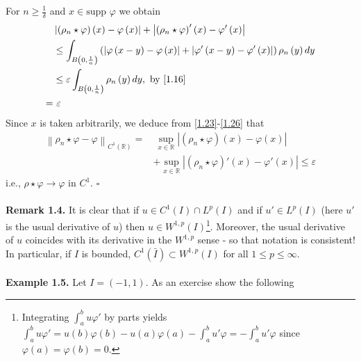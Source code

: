 \documentclass[a4paper,oneside]{book}
\numberwithin{equation}{chapter}
\begin{document}
For $n\ge \frac{1}{\delta}$ and $x\in \mbox{supp }\varphi$ we obtain
\begin{align}
\label{1.23}
&\left| {\left( {{\rho _n}\star \varphi } \right)\left( x \right) - \varphi \left( x \right)} \right| + \left| {\left( {{\rho _n}\star\varphi } \right)'\left( x \right) - \varphi '\left( x \right)} \right|\\
 &\le \int_{B\left( {0,\frac{1}{n}} \right)} {\left( {\left| {\varphi \left( {x - y} \right) - \varphi \left( x \right)} \right| + \left| {\varphi '\left( {x - y} \right) - \varphi '\left( x \right)} \right|} \right){\rho _n}\left( y \right)dy} \\
& \le \varepsilon \int_{B\left( {0,\frac{1}{n}} \right)} {{\rho _n}\left( y \right)dy},\mbox{ by \eqref{1.16}}\\
=&\ \varepsilon  \label{1.26}
\end{align}
Since $x$ is taken arbitrarily, we deduce from \eqref{1.23}-\eqref{1.26} that
\begin{align}
{\left\| {{\rho _n}\star \varphi  - \varphi } \right\|_{{C^1}\left( \mathbb{R} \right)}} =&\ \mathop {\sup }\limits_{x \in \mathbb{R}} \left| {\left( {{\rho _n}\star \varphi } \right)\left( x \right) - \varphi \left( x \right)} \right| \\
&+ \mathop {\sup }\limits_{x \in \mathbb{R}} \left| {\left( {{\rho _n}\star\varphi } \right)'\left( x \right) - \varphi '\left( x \right)} \right| \le \varepsilon 
\end{align}
i.e., $\rho \star \varphi \to \varphi$ in $C^1$. \hfill $\square$\\
\\
\textbf{Remark 1.4.} It is clear that if $u \in {C^1}\left( I \right) \cap {L^p}\left( I \right)$ and if $u' \in {L^p}\left( I \right)$ (here $u'$ is the usual derivative of $u$) then $u\in W^{1,p}\left(I\right)$\footnote{Integrating $\int_a^b {u\varphi '} $ by parts yields $\int_a^b {u\varphi '}  = u\left( b \right)\varphi \left( b \right) - u\left( a \right)\varphi \left( a \right) - \int_a^b {u'\varphi }  =  - \int_a^b {u'\varphi } $ since $\varphi \left(a\right)=\varphi \left(b\right)=0$.}. Moreover, the usual derivative of $u$ coincides with its derivative in the $W^{1,p}$ sense - so that notation is consistent! In particular, if $I$ is bounded, ${C^1}\left( {\bar I } \right) \subset {W^{1,p}}\left( I \right)$ for all $1\le p \le \infty$.\\
\\
\textbf{Example 1.5.} Let $I=\left(-1,1\right)
$. As an exercise show the following
\end{document}
